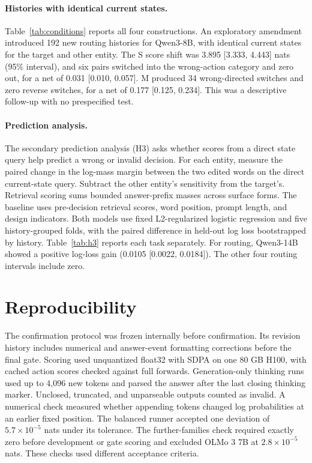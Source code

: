 \paragraph{Histories with identical current states.}
Table~\ref{tab:conditions} reports all four constructions. An exploratory amendment introduced 192 new routing histories for Qwen3-8B, with identical current states for the target and other entity. The S score shift was 3.895 [3.333, 4.443] nats (95\% interval), and six pairs switched into the wrong-action category and zero out, for a net of 0.031 [0.010, 0.057]. M produced 34 wrong-directed switches and zero reverse switches, for a net of 0.177 [0.125, 0.234]. This was a descriptive follow-up with no prespecified test.

\paragraph{Prediction analysis.}
The secondary prediction analysis (H3) asks whether scores from a direct state query help predict a wrong or invalid decision. For each entity, measure the paired change in the log-mass margin between the two edited words on the direct current-state query. Subtract the other entity's sensitivity from the target's. Retrieval scoring sums bounded answer-prefix masses across surface forms. The baseline uses pre-decision retrieval scores, word position, prompt length, and design indicators. Both models use fixed L2-regularized logistic regression and five history-grouped folds, with the paired difference in held-out log loss bootstrapped by history. Table~\ref{tab:h3} reports each task separately. For routing, Qwen3-14B showed a positive log-loss gain (0.0105 [0.0022, 0.0184]). The other four routing intervals include zero.

\section{Reproducibility}
The confirmation protocol was frozen internally before confirmation. Its revision history includes numerical and answer-event formatting corrections before the final gate. Scoring used unquantized float32 with SDPA on one 80 GB H100, with cached action scores checked against full forwards. Generation-only thinking runs used up to 4,096 new tokens and parsed the answer after the last closing thinking marker. Unclosed, truncated, and unparseable outputs counted as invalid. A numerical check measured whether appending tokens changed log probabilities at an earlier fixed position. The balanced runner accepted one deviation of $5.7\times10^{-5}$ nats under its tolerance. The further-families check required exactly zero before development or gate scoring and excluded OLMo 3 7B at $2.8\times10^{-5}$ nats. These checks used different acceptance criteria.


